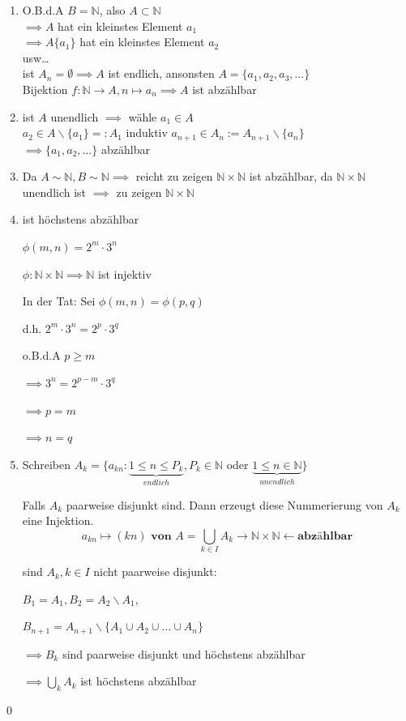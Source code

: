 \documentclass[fleqn]{scrbook}
\renewenvironment{proof}{{\bfseries Beweis }}{\qed}
\begin{document}
\begin{proof}
\begin{enumerate}[1)]
\item O.B.d.A $B = \mathbb{N}$, also $A \subset \mathbb{N}$\\$\implies A$ hat ein kleinstes Element $a_1$\\$\implies A \{a_1\}$ hat ein kleinstes Element $a_2$\\usw\ldots\\ist $A_n = \emptyset \implies A$ ist endlich, ansonsten $A = \{a_1, a_2, a_3, \ldots\}$\\Bijektion $f:\mathbb{N}\rightarrow A, n\mapsto a_n \implies A$ ist abzählbar
\item ist $A$ unendlich $\implies$ wähle $a_1 \in A$\\
	$a_2 \in A \backslash \{a_1\} =: A_1$
	induktiv $a_{n+1} \in A_n := A_{n+1} \backslash \{a_n\}$\\
	$\implies \{a_1, a_2, \ldots\}$ abzählbar
	
\item Da $A \sim \mathbb{N}, B \sim \mathbb{N} \implies$ reicht zu zeigen $\mathbb{N} \times \mathbb{N}$ ist abzählbar, da $\mathbb{N} \times \mathbb{N}$ unendlich ist $\implies$ zu zeigen $\mathbb{N} \times \mathbb{N}$
\item ist höchstens abzählbar

	$\phi (m,n) = 2^m  \cdot  3^n$
	
	$\phi : \mathbb{N} \times \mathbb{N} \implies \mathbb{N}$ ist injektiv
	
	In der Tat: Sei $\phi (m,n) = \phi (p,q)$
	
	d.h. $2^m  \cdot  3^n = 2^p  \cdot  3^q$
	
	o.B.d.A $p \geq m$
	
	$\implies 3^n = 2^{p-m}  \cdot  3^q$
	
	$\implies p = m$
	
	$\implies n = q$
	
\item Schreiben $A_k = \{a_{kn} :\underbrace{1\leq n \leq P_k}_{endlich}, P_k \in \mathbb{N}$ oder $\underbrace{1 \leq n \in \mathbb{N}}_{unendlich}\}$

	Falls $A_k$ paarweise disjunkt sind. Dann erzeugt diese Nummerierung von $A_k$ eine Injektion.
	\[a_{kn} \mapsto (kn) \textbf{ von } A = \bigcup_{k \in I} A_k \rightarrow \mathbb{N} \times \mathbb{N} \leftarrow \textbf{abzählbar}\]
	
	sind $A_k, k \in I$ nicht paarweise disjunkt:
	
	$B_1 = A_1, B_2 = A_2 \backslash A_1,$
	
	$B_{n+1} = A_{n+1} \backslash \{A_1 \cup A_2 \cup \ldots \cup A_n\}$
	
	$\implies B_k$ sind paarweise disjunkt und höchstens abzählbar
	
	$\implies \bigcup_{k} A_k$ ist höchstens abzählbar
\end{enumerate}
\end{proof}
\end{document}
